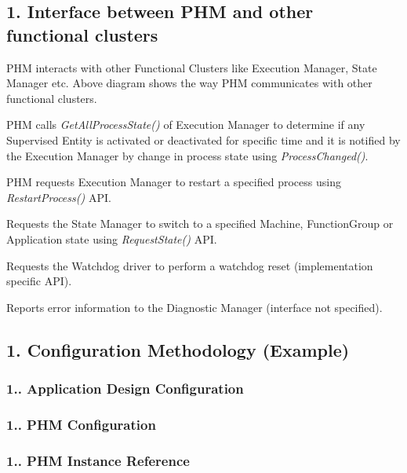 \subsection*{1. Interface between P\+HM and other functional clusters}

 P\+HM interacts with other Functional Clusters like Execution Manager, State Manager etc. Above diagram shows the way P\+HM communicates with other functional clusters.


\begin{DoxyItemize}
\item P\+HM calls {\itshape Get\+All\+Process\+State()} of Execution Manager to determine if any Supervised Entity is activated or deactivated for specific time and it is notified by the Execution Manager by change in process state using {\itshape Process\+Changed()}.
\item P\+HM requests Execution Manager to restart a specified process using {\itshape Restart\+Process()} A\+PI.
\item Requests the State Manager to switch to a specified Machine, Function\+Group or Application state using {\itshape Request\+State()} A\+PI.
\item Requests the Watchdog driver to perform a watchdog reset (implementation specific A\+PI).
\item Reports error information to the Diagnostic Manager (interface not specified).
\end{DoxyItemize}

\subsection*{1. Configuration Methodology (Example)}

\subsubsection*{1.. Application Design Configuration}

 \subsubsection*{1.. P\+HM Configuration}

 \subsubsection*{1.. P\+HM Instance Reference}



